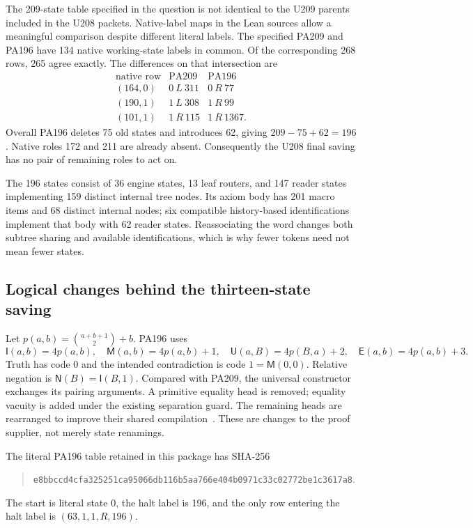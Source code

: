 \documentclass[11pt,letterpaper]{article}
\newcommand{\I}{\mathsf I}
\newcommand{\M}{\mathsf M}
\newcommand{\U}{\mathsf U}
\newcommand{\E}{\mathsf E}
\newcommand{\Nn}{\mathsf N}
\begin{document}
The 209-state table specified in the question is not identical to the
U209 parents included in the U208 packets. Native-label maps in the Lean
sources allow a meaningful comparison despite different literal labels.
The specified PA209 and PA196 have 134 native working-state labels in
common. Of the corresponding 268 rows, 265 agree exactly. The differences
on that intersection are
\[
\begin{array}{c|c|c}
\text{native row}&\text{PA209}&\text{PA196}\\\hline
(164,0)&0\ L\ 311&0\ R\ 77\\
(190,1)&1\ L\ 308&1\ R\ 99\\
(101,1)&1\ R\ 115&1\ R\ 1367.
\end{array}
\]
Overall PA196 deletes 75 old states and introduces 62, giving
$209-75+62=196$. Native roles 172 and 211 are already absent. Consequently
the U208 final saving has no pair of remaining roles to act on.

The 196 states consist of 36 engine states, 13 leaf routers, and 147
reader states implementing 159 distinct internal tree nodes. Its axiom
body has 201 macro items and 68 distinct internal nodes; six compatible
history-based identifications implement that body with 62 reader states.
Reassociating the word changes both subtree sharing and available
identifications, which is why fewer tokens need not mean fewer states.

\subsection{Logical changes behind the thirteen-state saving}

Let $p(a,b)=\binom{a+b+1}{2}+b$. PA196 uses
\[
 \I(a,b)=4p(a,b),\quad \M(a,b)=4p(a,b)+1,\quad
 \U(a,B)=4p(B,a)+2,\quad \E(a,b)=4p(a,b)+3.
\]
Truth has code 0 and the intended contradiction is code
$1=\M(0,0)$. Relative negation is $\Nn(B)=\I(B,1)$.
Compared with PA209, the universal constructor exchanges its pairing
arguments. A primitive equality head is removed; equality vacuity is
added under the existing separation guard. The remaining heads are
rearranged to improve their shared compilation~\cite{pa196,pa209}.
These are changes to the proof supplier, not merely state renamings.

The literal PA196 table retained in this package has SHA-256
\begin{quote}\small
\nolinkurl{e8bbccd4cfa325251ca95066db116b5aa766e404b0971c33c02772be1c3617a8}.
\end{quote}
The start is literal state 0, the halt label is 196, and the only row
entering the halt label is $(63,1,1,R,196)$.
\end{document}
